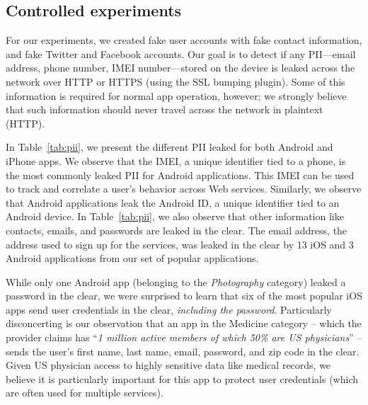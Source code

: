 \subsection{Controlled experiments}

For our experiments, we created fake user accounts with fake contact
information, and fake Twitter and Facebook accounts.  Our goal is to
detect if any PII---email
address, phone number, IMEI number---stored on the device is leaked
across the network over HTTP or HTTPS (using the SSL bumping plugin).
Some of this information is required for normal app operation, however; we strongly believe that such information should
never travel across the network in plaintext (HTTP). 

In Table~\ref{tab:pii}, we present the different PII leaked for both Android and iPhone apps.  We observe that
the IMEI, a unique identifier tied to a phone, is the most commonly
leaked PII for Android applications.  This IMEI can be used to track
and correlate a user's behavior across Web services.  Similarly, we
observe that Android applications leak the Android ID, a unique
identifier tied to an Android device.  In Table~\ref{tab:pii}, we also
observe that other information like contacts, emails, and passwords
are leaked in the clear.  The email address, the address used to sign
up for the services, was leaked in the clear by 13 iOS and 3 Android
applications from our set of popular applications.

While only one Android app (belonging to the \emph{Photography} category) leaked a password in the clear, 
we were surprised to learn that six of the most popular iOS apps send user 
credentials in the clear, \emph{including the password}. Particularly disconcerting 
is our observation that an app in the Medicine category -- which the provider claims has ``\emph{1 million active members 
of which 50\% are US physicians}'' -- sends the user's first name, last name, 
email, password, and zip code in the clear. Given US physician access to highly sensitive 
data like medical records, we believe it is particularly important for this app to protect 
user credentials (which are often used for multiple services). 



